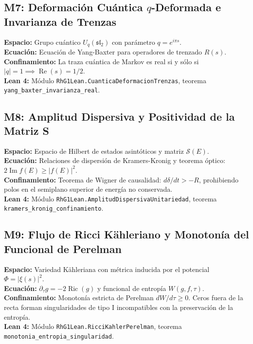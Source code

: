 \documentclass[11pt,a4paper]{article}
\begin{document}
\subsection{M7: Deformación Cuántica $q$-Deformada e Invarianza de Trenzas}
\textbf{Espacio:} Grupo cuántico $U_q(\mathfrak{sl}_2)$ con parámetro $q = e^{i\pi s}$.\\
\textbf{Ecuación:} Ecuación de Yang-Baxter para operadores de trenzado $R(s)$.\\
\textbf{Confinamiento:} La traza cuántica de Markov es real si y sólo si $|q| = 1 \implies \operatorname{Re}(s) = 1/2$.\\
\textbf{Lean 4:} Módulo \texttt{RhG1Lean.CuanticaDeformacionTrenzas}, teorema \texttt{yang\_baxter\_invarianza\_real}.

\subsection{M8: Amplitud Dispersiva y Positividad de la Matriz S}
\textbf{Espacio:} Espacio de Hilbert de estados asintóticos y matriz $\mathcal{S}(E)$.\\
\textbf{Ecuación:} Relaciones de dispersión de Kramers-Kronig y teorema óptico: $2\operatorname{Im} f(E) \ge |f(E)|^2$.\\
\textbf{Confinamiento:} Teorema de Wigner de causalidad: $d\delta/dt > -R$, prohibiendo polos en el semiplano superior de energía no conservada.\\
\textbf{Lean 4:} Módulo \texttt{RhG1Lean.AmplitudDispersivaUnitariedad}, teorema \texttt{kramers\_kronig\_confinamiento}.

\subsection{M9: Flujo de Ricci Kähleriano y Monotonía del Funcional de Perelman}
\textbf{Espacio:} Variedad Kähleriana con métrica inducida por el potencial $\Phi = |\xi(s)|^2$.\\
\textbf{Ecuación:} $\partial_\tau g = -2\operatorname{Ric}(g)$ y funcional de entropía $W(g, f, \tau)$.\\
\textbf{Confinamiento:} Monotonía estricta de Perelman $dW/d\tau \ge 0$. Ceros fuera de la recta forman singularidades de tipo I incompatibles con la preservación de la entropía.\\
\textbf{Lean 4:} Módulo \texttt{RhG1Lean.RicciKahlerPerelman}, teorema \texttt{monotonia\_entropia\_singularidad}.
\end{document}
